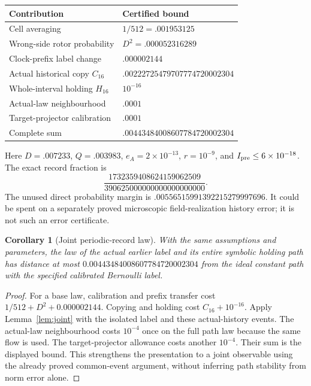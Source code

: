 \documentclass[11pt]{article}
\newtheorem{corollary}[theorem]{Corollary}
\theoremstyle{definition}\newtheorem{definition}[theorem]{Definition}
\theoremstyle{remark}\newtheorem{remark}[theorem]{Remark}
\begin{document}
\begin{center}\small
\begin{tabular}{@{}p{.56\linewidth}p{.36\linewidth}@{}}\toprule
Contribution & Certified bound\\\midrule
Cell averaging & $1/512=.001953125$\\
Wrong-side rotor probability & $D^2=.000052316289$\\
Clock-prefix label change & $.000002144$\\
Actual historical copy $C_{16}$ & $.00222725479707774720002304$\\
Whole-interval holding $H_{16}$ & $10^{-16}$\\
Actual-law neighbourhood & $.0001$\\
Target-projector calibration & $.0001$\\\midrule
Complete sum & $.00443484008607784720002304$\\\bottomrule
\end{tabular}
\end{center}
Here $D=.007233$, $Q=.003983$, $e_A=2\times10^{-13}$, $r=10^{-9}$, and $I_{\rm pre}\le6\times10^{-18}$. The exact record fraction is
\[
 \frac{1732359408624159062509}{390625000000000000000000}.
\]
The unused direct probability margin is $.00556515991392215279997696$. It could be spent on a separately proved microscopic field-realization history error; it is not such an error certificate.


\begin{corollary}[Joint periodic-record law]\label{cor:periodicjoint}
With the same assumptions and parameters, the law of the actual earlier
label and its entire symbolic holding path has distance at most
$0.00443484008607784720002304$ from the ideal constant path with the
specified calibrated Bernoulli label.
\end{corollary}
\begin{proof}
For a base law, calibration and prefix transfer cost
$1/512+D^2+0.000002144$. Copying and holding cost
$C_{16}+10^{-16}$. Apply Lemma~\ref{lem:joint} with the isolated label
and these actual-history events. The actual-law neighbourhood costs
$10^{-4}$ once on the full path law because the same flow is used.
The target-projector allowance costs another $10^{-4}$. Their sum is
the displayed bound. This strengthens the presentation to a joint
observable using the already proved common-event argument, without
inferring path stability from norm error alone.
\end{proof}
\end{document}
